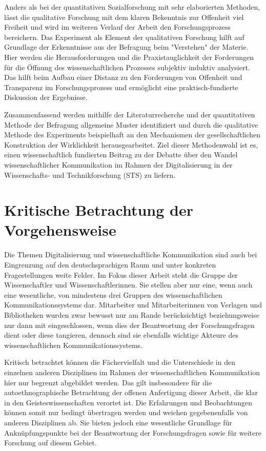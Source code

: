 Anders als bei der quantitativen Sozialforschung mit sehr elaborierten Methoden, lässt die qualitative Forschung mit dem klaren Bekenntnis zur Offenheit viel Freiheit und wird im weiteren Verlauf der Arbeit den Forschungsprozess bereichern. Das Experiment als Element der qualitativen Forschung hilft auf Grundlage der Erkenntnisse aus der Befragung beim "Verstehen" der Materie. Hier werden die Herausforderungen und die Praxistauglichkeit der Forderungen für die Öffnung des wissenschaftlichen Prozesses subjektiv induktiv analysiert. Das hilft beim Aufbau einer Distanz zu den Forderungen von Offenheit und Transparenz im Forschungsprozess und ermöglicht eine praktisch-fundierte Diskussion der Ergebnisse.

Zusammenfassend werden mithilfe der Literaturrecherche und der quantitativen Methode der Befragung allgemeine Muster identifiziert und durch die qualitative Methode des Experiments beispielhaft an den Mechanismen der gesellschaftlichen Konstruktion der Wirklichkeit herausgearbeitet. Ziel dieser Methodenwahl ist es, einen wissenschaftlich fundierten Beitrag zu der Debatte über den Wandel wissenschaftlicher Kommunikation im Rahmen der Digitalisierung in der Wissenschafts- und Technikforschung (STS) zu liefern.

\section{Kritische Betrachtung der Vorgehensweise}

Die Themen Digitalisierung und wissenschaftliche Kommunikation sind auch bei Eingrenzung auf den deutschsprachigen Raum und unter konkreten Fragestellungen weite Felder. Im Fokus dieser Arbeit steht die Gruppe der Wissenschaftler und Wissenschaftlerinnen. Sie stellen aber nur eine, wenn auch eine wesentliche, von mindestens drei Gruppen des wissenschaftlichen Kommunikationssystems dar. Mitarbeiter und Mitarbeiterinnen von Verlagen und Bibliotheken wurden zwar bewusst nur am Rande berücksichtigt beziehungsweise nur dann mit eingeschlossen, wenn dies der Beantwortung der Forschungsfragen dient oder diese tangieren, dennoch sind sie ebenfalls wichtige Akteure des wissenschaftlichen Kommunikationssystems.

Kritisch betrachtet können die Fächervielfalt und die Unterschiede in den einzelnen anderen Disziplinen im Rahmen der wissenschaftlichen Kommunikation hier nur begrenzt abgebildet werden. Das gilt insbesondere für die autoethnographische Betrachtung der offenen Anfertigung dieser Arbeit, die klar in den Geisteswissenschaften verortet ist. Die Erfahrungen und Beobachtungen können somit nur bedingt übertragen werden und weichen gegebenenfalls von anderen Disziplinen ab. Sie bieten jedoch eine wesentliche Grundlage für Anknüpfungspunkte bei der Beantwortung der Forschungsfragen sowie für weitere Forschung auf diesem Gebiet.

